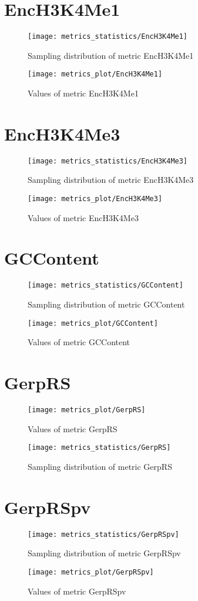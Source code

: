 \section{EncH3K4Me1}
\begin{figure}
  \texttt{[image: metrics\_statistics/EncH3K4Me1]}
  \caption{Sampling distribution of metric EncH3K4Me1}
\end{figure}
\begin{figure}
  \texttt{[image: metrics\_plot/EncH3K4Me1]}
  \caption{Values of metric EncH3K4Me1}
\end{figure}
\section{EncH3K4Me3}
\begin{figure}
  \texttt{[image: metrics\_statistics/EncH3K4Me3]}
  \caption{Sampling distribution of metric EncH3K4Me3}
\end{figure}
\begin{figure}
  \texttt{[image: metrics\_plot/EncH3K4Me3]}
  \caption{Values of metric EncH3K4Me3}
\end{figure}
\section{GCContent}
\begin{figure}
  \texttt{[image: metrics\_statistics/GCContent]}
  \caption{Sampling distribution of metric GCContent}
\end{figure}
\begin{figure}
  \texttt{[image: metrics\_plot/GCContent]}
  \caption{Values of metric GCContent}
\end{figure}
\section{GerpRS}
\begin{figure}
  \texttt{[image: metrics\_plot/GerpRS]}
  \caption{Values of metric GerpRS}
\end{figure}
\begin{figure}
  \texttt{[image: metrics\_statistics/GerpRS]}
  \caption{Sampling distribution of metric GerpRS}
\end{figure}
\section{GerpRSpv}
\begin{figure}
  \texttt{[image: metrics\_statistics/GerpRSpv]}
  \caption{Sampling distribution of metric GerpRSpv}
\end{figure}
\begin{figure}
  \texttt{[image: metrics\_plot/GerpRSpv]}
  \caption{Values of metric GerpRSpv}
\end{figure}
